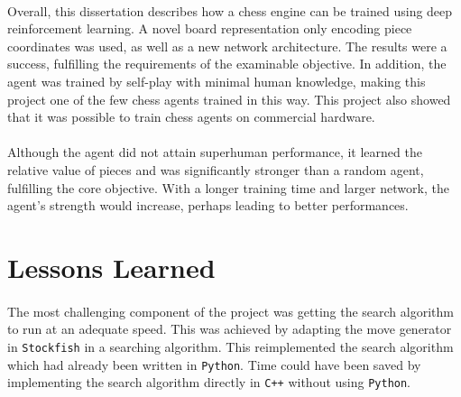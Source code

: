 \documentclass[12pt,a4paper]{book}
\begin{document}
\paragraph{} Overall, this dissertation describes how a chess engine can be trained using deep reinforcement learning. A novel board representation only encoding piece coordinates was used, as well as a new network architecture. The results were a success, fulfilling the requirements of the examinable objective. In addition, the agent was trained by self-play with minimal human knowledge, making this project one of the few chess agents trained in this way. This project also showed that it was possible to train chess agents on commercial hardware.

\paragraph{} Although the agent did not attain superhuman performance, it learned the relative value of pieces and was significantly stronger than a random agent, fulfilling the core objective. With a longer training time and larger network, the agent's strength would increase, perhaps leading to better performances.


\section{Lessons Learned}

\paragraph{} The most challenging component of the project was getting the search algorithm to run at an adequate speed. This was achieved by adapting the move generator in \texttt{Stockfish} in a searching algorithm. This reimplemented the search algorithm which had already been written in \texttt{Python}. Time could have been saved by implementing the search algorithm directly in \texttt{C++} without using \texttt{Python}.
\end{document}
